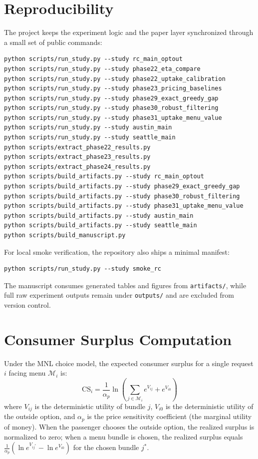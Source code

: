 \section{Reproducibility}
\label{app:reproducibility}

The project keeps the experiment logic and the paper layer synchronized through a small set of public commands:

\begin{verbatim}
python scripts/run_study.py --study rc_main_optout
python scripts/run_study.py --study phase22_eta_compare
python scripts/run_study.py --study phase22_uptake_calibration
python scripts/run_study.py --study phase23_pricing_baselines
python scripts/run_study.py --study phase29_exact_greedy_gap
python scripts/run_study.py --study phase30_robust_filtering
python scripts/run_study.py --study phase31_uptake_menu_value
python scripts/run_study.py --study austin_main
python scripts/run_study.py --study seattle_main
python scripts/extract_phase22_results.py
python scripts/extract_phase23_results.py
python scripts/extract_phase24_results.py
python scripts/build_artifacts.py --study rc_main_optout
python scripts/build_artifacts.py --study phase29_exact_greedy_gap
python scripts/build_artifacts.py --study phase30_robust_filtering
python scripts/build_artifacts.py --study phase31_uptake_menu_value
python scripts/build_artifacts.py --study austin_main
python scripts/build_artifacts.py --study seattle_main
python scripts/build_manuscript.py
\end{verbatim}

For local smoke verification, the repository also ships a minimal manifest:

\begin{verbatim}
python scripts/run_study.py --study smoke_rc
\end{verbatim}

The manuscript consumes generated tables and figures from \texttt{artifacts/}, while full raw experiment outputs remain under \texttt{outputs/} and are excluded from version control.

\section{Consumer Surplus Computation}
\label{app:consumer_surplus}

Under the MNL choice model, the expected consumer surplus for a single request $i$ facing menu $\mathcal{M}_i$ is:
\begin{equation}
\text{CS}_i = \frac{1}{\alpha_p} \ln\!\left(\sum_{j \in \mathcal{M}_i} e^{V_{ij}} + e^{V_{i0}}\right)
\end{equation}
where $V_{ij}$ is the deterministic utility of bundle $j$, $V_{i0}$ is the deterministic utility of the outside option, and $\alpha_p$ is the price sensitivity coefficient (the marginal utility of money). When the passenger chooses the outside option, the realized surplus is normalized to zero; when a menu bundle is chosen, the realized surplus equals $\frac{1}{\alpha_p}(\ln e^{V_{ij^*}} - \ln e^{V_{i0}})$ for the chosen bundle $j^*$.

